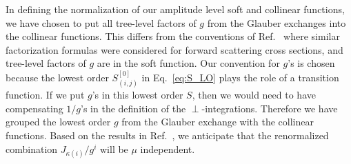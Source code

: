 \documentclass[letterpaper,11pt]{article}
\newcommand{\eq}[1]{Eq.~\eqref{eq:#1}}
\newcommand{\gs}{g}
\begin{document}
In defining the normalization of our amplitude level soft and collinear functions, we have chosen to put all tree-level factors of $g$ from the Glauber exchanges into the collinear functions. This differs from the conventions of Ref.~\cite{Rothstein:2016bsq} where similar factorization formulas were considered for forward scattering cross sections, and tree-level factors of $g$ are in the soft function. 
Our convention for $g$'s is chosen because the lowest  order $S_{(i,j)}^{[0]}$ in \eq{S_LO} plays the role of a transition function. If we put $g$'s in this lowest order $S$, then we would need to have compensating $1/g$'s in the definition of the $\perp$-integrations. Therefore we have grouped the lowest order $\gs$ from the Glauber exchange with the collinear functions.  
Based on the results in Ref.~\cite{Rothstein:2016bsq}, we anticipate that the renormalized combination $J_{\kappa(i)}/g^i$ will be $\mu$ independent. 
\end{document}

